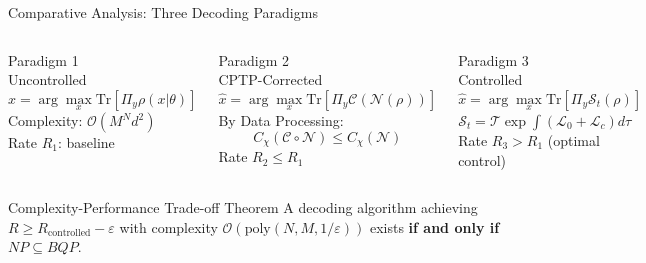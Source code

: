 \documentclass[aspectratio=169,10pt]{beamer}
\newcommand{\Tr}{\mathrm{Tr}}
\begin{document}
\begin{frame}{Comparative Analysis: Three Decoding Paradigms}
  \begin{columns}[T]
      \begin{block}{Paradigm 1\\Uncontrolled}
        \[
          \hat x=\arg\max_x\Tr[\Pi_y\rho(x|\theta)]
        \]
        Complexity: $\mathcal{O}(M^N d^2)$\\[4pt]
        Rate $R_1$: baseline
      \end{block}

      \begin{block}{Paradigm 2\\CPTP-Corrected}
        \[
          \hat x=\arg\max_x\Tr[\Pi_y\mathcal{C}(\mathcal{N}(\rho))]
        \]
        By Data Processing:
        \[
          C_\chi(\mathcal{C}\circ\mathcal{N})\le C_\chi(\mathcal{N})
        \]
        Rate $R_2\le R_1$
      \end{block}

      \begin{alertblock}{Paradigm 3\\Controlled}
        \[
          \hat x=\arg\max_x\Tr[\Pi_y\mathcal{S}_t(\rho)]
        \]
        $\mathcal{S}_t=\mathcal{T}\exp\int(\mathcal{L}_0+\mathcal{L}_c)d\tau$\\[4pt]
        Rate $R_3>R_1$ (optimal control)
      \end{alertblock}
  \end{columns}

  \bigskip
  \begin{alertblock}{Complexity-Performance Trade-off Theorem}
    A decoding algorithm achieving $R\ge R_{\text{controlled}}-\varepsilon$
    with complexity $\mathcal{O}(\mathrm{poly}(N,M,1/\varepsilon))$ exists
    \textbf{if and only if} $NP\subseteq BQP$.
  \end{alertblock}
\end{frame}
\end{document}
